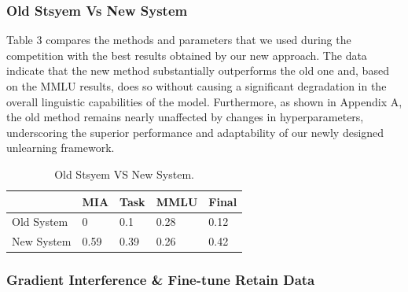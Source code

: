 \documentclass[11pt]{article}
\begin{document}
\subsubsection{Old Stsyem Vs New System} 
Table 3 compares the methods and parameters that we used during the competition with the best results obtained by our new approach. The data indicate that the new method substantially outperforms the old one and, based on the MMLU results, does so without causing a significant degradation in the overall linguistic capabilities of the model. Furthermore, as shown in Appendix A, the old method remains nearly unaffected by changes in hyperparameters, underscoring the superior performance and adaptability of our newly designed unlearning framework.
\begin{table}[h]
  \centering
    \begin{tabular}{l|l|l|l|l}
    \hline
         & MIA & Task & MMLU & Final \\ \hline
        Old System & 0 & 0.1 & 0.28 & 0.12 \\ \hline
        New System & 0.59 & 0.39 & 0.26 & 0.42 \\ \hline
    \end{tabular}
  \caption{Old Stsyem VS New System.}
  \label{tab:accents}
\end{table}



\subsubsection{Gradient Interference \& Fine-tune Retain Data} 
\end{document}
